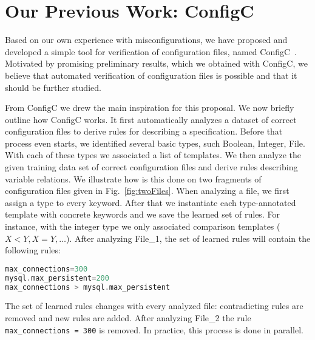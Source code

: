 \section{Our Previous Work: ConfigC}
\label{sec:prelim}

Based on our own experience with misconfigurations,
we have proposed and developed a simple tool for verification of 
configuration files, named
ConfigC~\cite{santolucitoCAV}. Motivated by promising preliminary
results, which we obtained with ConfigC, we believe that automated 
verification of configuration files is possible and that it should be further studied.

From ConfigC we drew the main inspiration for this proposal. We now briefly
outline how ConfigC works. It first automatically
analyzes a dataset of correct configuration files to derive
 rules for describing a specification. Before that process even starts,
we identified several basic types, 
such Boolean, Integer, File. With each of these types we associated a 
list of templates. We then analyze the given training data set of 
correct configuration files and derive rules describing variable                                                                                                                                                                                                                                                                                                                                                                                                                       
relations. We illustrate how is this done on two fragments of 
configuration files given in Fig.~\ref{fig:twoFiles}.  When analyzing
a file, we first assign a type to every 
keyword. After that we instantiate each type-annotated template with 
concrete keywords and we save the learned set 
of rules. For instance, with the integer type we only associated comparison templates ($X < Y, X = Y, \ldots$). After 
analyzing File\_1, the set of learned rules will contain the following rules:
\begin{lstlisting}[language=C, xleftmargin=.01\textwidth]
max_connections=300
mysql.max_persistent=200
max_connections > mysql.max_persistent
\end{lstlisting}
The set of learned rules changes with every analyzed file: contradicting 
rules are removed and new rules are added. After analyzing File\_2 the rule \texttt{max\_connections = 300} is removed. In practice, this process is done 
in parallel. 


